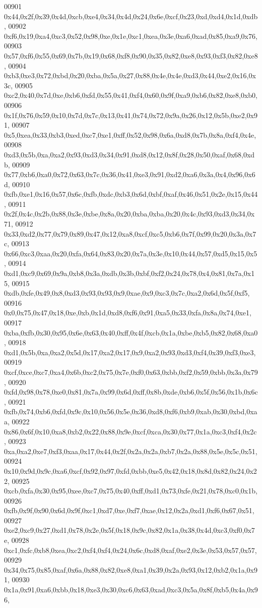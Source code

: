 \begin{DoxyCode}
00901   0x44,0x2f,0x39,0x4d,0xcb,0xe4,0x34,0x4d,0x24,0x6e,0xcf,0x23,0xd,0xd4,0x1d,0xdb,
00902   0xf6,0x19,0xa4,0xc3,0x52,0x98,0xe,0x1e,0xc1,0xea,0x3e,0xa6,0xad,0x85,0xa9,0x76,
00903   0x57,0xf6,0x55,0x69,0x7b,0x19,0x68,0xf8,0x90,0x35,0x82,0xe8,0x93,0xf3,0x82,0xe8,
00904   0xb3,0xe3,0x72,0xbd,0x20,0xba,0x5a,0x27,0x88,0x4e,0x4e,0xd3,0x44,0xe2,0x16,0x3c,
00905   0xc2,0x40,0x7d,0xe,0xb6,0xfd,0x55,0x41,0xf4,0x60,0x9f,0xa9,0xb6,0x82,0xe8,0xb0,
00906   0x1f,0x76,0x59,0x10,0x7d,0x7c,0x13,0x41,0x74,0x72,0x9a,0x26,0x12,0x5b,0xe2,0x91,
00907   0x5,0xea,0x33,0xb3,0xed,0xc7,0xe1,0xff,0x52,0x98,0x6a,0xd8,0x7b,0x8a,0xf4,0x4e,
00908   0xd3,0x5b,0xa,0xa2,0x93,0xd3,0x34,0x91,0xd8,0x12,0x8f,0x28,0x50,0xaf,0x68,0xdb,
00909   0x77,0xb6,0xa0,0x72,0x63,0x7c,0x36,0x41,0xe3,0x91,0xd2,0xa6,0x3a,0x4,0x96,0x6d,
00910   0xfb,0xe1,0x16,0x57,0x6c,0xfb,0xdc,0xb3,0x6d,0xbf,0xaf,0x46,0x51,0x2e,0x15,0x44,
00911   0x2f,0x4c,0x2b,0x88,0x3e,0xbe,0x8a,0x20,0xba,0xba,0x20,0x4c,0x93,0xd3,0x34,0x71,
00912   0x33,0xd2,0x77,0x79,0x89,0x47,0x12,0xa8,0xcf,0xc5,0xb6,0x7f,0x99,0x20,0x3a,0x7c,
00913   0x66,0xc3,0xaa,0x20,0xfa,0x64,0x83,0x20,0x7a,0x3e,0x10,0x44,0x57,0xd5,0x15,0x5,
00914   0xd1,0xc9,0x69,0x9a,0xb8,0x3a,0xdb,0x3b,0xbf,0xf2,0x24,0x78,0x4,0x81,0x7a,0x15,
00915   0xdb,0xfe,0x49,0x8,0xd3,0x93,0x93,0x9,0xae,0x9,0xc3,0x7c,0xa2,0x6d,0x5f,0xf5,
00916   0x0,0x75,0x47,0x18,0xe,0xb,0x1d,0xd8,0xf6,0x91,0xa5,0x33,0xfa,0x8a,0x74,0xe1,
00917   0xba,0xfb,0x30,0x95,0x6e,0x63,0x40,0xff,0x4f,0xcb,0x1a,0xbe,0xb5,0x82,0x68,0xa0,
00918   0xd1,0x5b,0xa,0xa2,0x5d,0x17,0xa2,0x17,0x9,0xa2,0x93,0xd3,0xf4,0x39,0xf3,0xe3,
00919   0xcf,0xce,0xc7,0xa4,0x6b,0xc2,0x75,0x7e,0xf0,0x63,0xbb,0xf2,0x59,0xbb,0x3a,0x79,
00920   0xfd,0x98,0x78,0xe0,0x81,0x7a,0x99,0x6d,0xff,0x8b,0xde,0xb6,0x5f,0x56,0x1b,0x6c,
00921   0xfb,0x74,0xb6,0xfd,0x9c,0x10,0x56,0x5e,0x36,0xd8,0xf6,0xb9,0xab,0x30,0xbd,0xaa,
00922   0x86,0x6f,0x10,0xa8,0xb2,0x22,0x88,0x9e,0xcf,0xca,0x30,0x77,0x1a,0xc3,0xf4,0x2c,
00923   0xa,0xa2,0xe7,0xf3,0xaa,0x17,0x44,0x2f,0x2a,0x2a,0xb7,0x2a,0x88,0x5e,0x5c,0x51,
00924   0x10,0x9d,0x9c,0xa6,0xcf,0x92,0x97,0xfd,0xbb,0xe5,0x42,0x18,0x8d,0x82,0x24,0x22,
00925   0xcb,0xfa,0x30,0x95,0xee,0xc7,0x75,0x40,0xff,0xd1,0x73,0xfe,0x21,0x78,0xc0,0x1b,
00926   0xfb,0x9f,0x90,0x6d,0x9f,0xc1,0xd7,0xe,0xf7,0xae,0x12,0x2a,0xd1,0xf6,0x67,0x51,
00927   0xe2,0xc9,0x27,0xd1,0x78,0x2e,0x5f,0x18,0x9c,0x82,0x1a,0x38,0x4d,0xc3,0xf0,0x7e,
00928   0xc1,0xfc,0xb8,0xea,0xc2,0xf4,0xf4,0x24,0x6c,0xd8,0xaf,0xe2,0x3e,0x53,0x57,0x57,
00929   0x34,0x75,0x85,0xaf,0x6a,0x88,0x82,0xe8,0xa1,0x39,0x2a,0x93,0x12,0xb2,0x1a,0x91,
00930   0x1a,0x91,0xa6,0xbb,0x18,0xe3,0x30,0xc6,0x63,0xad,0xc3,0x5a,0x8f,0xb5,0x4a,0x96,

\end{DoxyCode}
